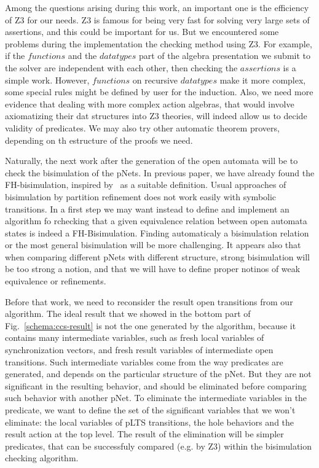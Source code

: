\documentclass{lncs/llncs}
\begin{document}
Among the questions arising during this work, an important one is the
efficiency of Z3 for our needs. Z3 is famous for being very fast for
solving very large sets of assertions, and this could be important for
us. But we encountered  some problems during the implementation the
checking method using Z3. For example, if the $functions$ and the
$datatypes$ part of the algebra presentation we submit to the solver
are independent with each other, then checking the $assertions$ is a
simple work. However, $functions$ on recursive $datatypes$ make it
more complex, some special rules might be defined by user for the
induction. Also, we need more evidence that dealing with more complex
action algebras, that would involve axiomatizing their dat structures
into Z3 theories, will indeed allow us to decide validity of
predicates.
We may also try other automatic theorem provers, depending on th
estructure of the proofs we need.

Naturally, the next work after the generation of the open automata
will be to check the bisimulation of the pNets. In previous paper, we
have already found the FH-bisimulation, inspired by~\cite{deSimone85} as a
suitable definition. Usual approaches of bisimulation by partition
refinement does not work easily with symbolic transitions. In a first
step we may want instead to define and implement an algorithm fo
rchecking that a given equivalence relation between open automata
states is indeed a FH-Bisimulation. Finding automaticaly a
bisimulation relation or the most general bisimulation will be more
challenging. It appears also that when comparing different pNets with
different structure, strong bisimulation will be too strong a notion,
and that we will have to define proper notinos of weak equivalence or
refinements. 

Before that work, we need to reconsider the result open transitions
from our algorithm. The ideal
result that we showed in the bottom part of
Fig.~\ref{schema:ccs-result} is not the one generated by the algorithm,
because it contains many intermediate
variables, such as fresh local variables of synchronization
vectors, and fresh result variables of intermediate open transitions.
Such intermediate variables come from the way predicates are
generated, and depends on the particular structure of the pNet. But
they are not significant in the resulting behavior, and should be
eliminated before comparing such behavior with another pNet.
To eliminate the intermediate variables in the predicate, we want to define
the set of the significant variables that we won't eliminate: the
local variables of pLTS transitions, the hole behaviors and the result
action at the top level.
The result of the elimination will be simpler predicates, that can be
successfuly compared (e.g. by Z3) within the bisimulation checking
algorithm.
\end{document}
